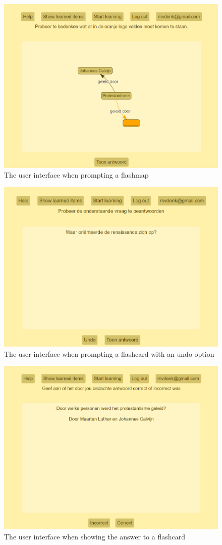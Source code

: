 \begin{figure}
    \centering
    \includegraphics[width=.8\textwidth]{img/ui_fm_prompt.png}
    \caption{The user interface when prompting a flashmap}
    \label{fig:ui_fm_prompt}
\end{figure}

\begin{figure}
    \centering
    \includegraphics[width=.8\textwidth]{img/ui_undo.png}
    \caption{The user interface when prompting a flashcard with an undo option}
    \label{fig:ui_undo}
\end{figure}

\begin{figure}
    \centering
    \includegraphics[width=.8\textwidth]{img/ui_fc_answer.png}
    \caption{The user interface when showing the answer to a flashcard}
    \label{fig:ui_fc_answer}
\end{figure}

